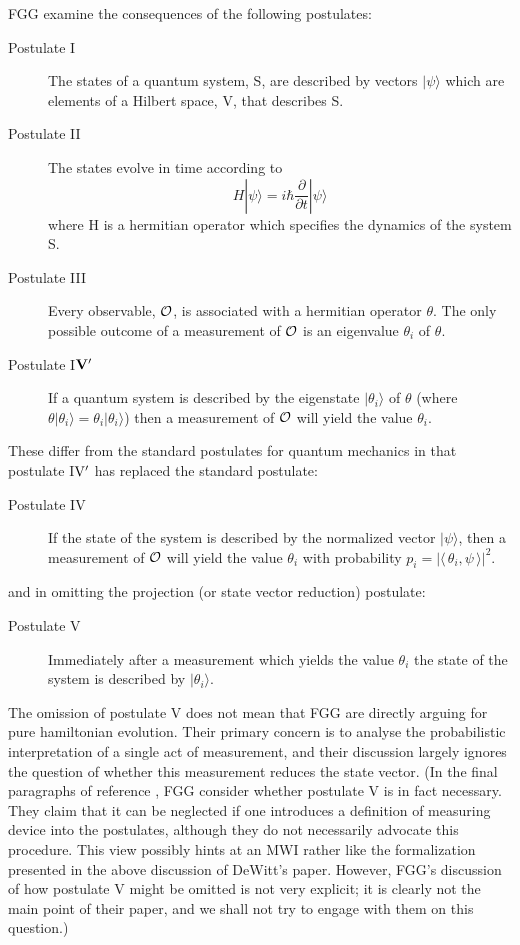 \documentclass[aps,pra,12pt]{revtex4}
\def\ket#1{| #1\rangle}
\def\inprod#1#2{\langle \,#1 , #2 \,\rangle}
\begin{document}
FGG examine the consequences of the following postulates:
\begin{description}
\item[Postulate I] The states of a quantum system, S, are described by vectors
$\ket{\psi}$ which are elements of a Hilbert space, V, that describes
S.
\item[Postulate II] The states evolve in time according to
\begin{equation}
H \ket{\psi} = i \hbar \frac{ \partial }{\partial t} \ket{\psi}
\end{equation}
where H is a hermitian operator which specifies the dynamics of the
system S.
\item[Postulate III]
Every observable, ${\cal O}$, is associated with a hermitian operator
$\theta$.  The only possible outcome of a measurement of ${\cal O}$ is
an eigenvalue $\theta_i$ of $\theta$.
\item[Postulate I${\bf V}^{\prime}$]
If a quantum system is described by the eigenstate $\ket{\theta_i}$ of
$\theta$ (where \mbox{$\theta \ket{\theta_i} = \theta_i \ket{\theta_i}$)}
then a measurement of ${\cal O}$ will yield the value $\theta_i$.
\end{description} 
These differ from the standard postulates for quantum mechanics in
that postulate I${\rm V}^{\prime}$ has replaced the standard
postulate:
\begin{description}
\item[Postulate IV] If the state of the system is 
described by the normalized vector $\ket{\psi}$, then a measurement of
${\cal O}$ will yield the value $\theta_i$ with probability $p_i = |
\inprod{\theta_i}{\psi} |^2$.
\end{description} 
and in omitting the projection (or state vector reduction) postulate:
\begin{description}
\item[Postulate V]
Immediately after a measurement which yields the value $\theta_i$ the
state of the system is described by $\ket{\theta_i}$.
\end{description} 

The omission of postulate V does not mean that FGG are directly
arguing for pure hamiltonian evolution.  Their primary concern is to
analyse the probabilistic interpretation of a single act of
measurement, and their discussion largely ignores the question of
whether this measurement reduces the state vector.  (In the final
paragraphs of reference \cite{fgg}, FGG consider whether postulate V
is in fact necessary.  They claim that it can be neglected if one
introduces a definition of measuring device into the postulates,
although they do not necessarily advocate this procedure.  This view
possibly hints at an MWI rather like the formalization presented in
the above discussion of DeWitt's paper.  However, FGG's discussion of
how postulate V might be omitted is not very explicit; it is clearly
not the main point of their paper, and we shall not try to engage with
them on this question.)
\end{document}
